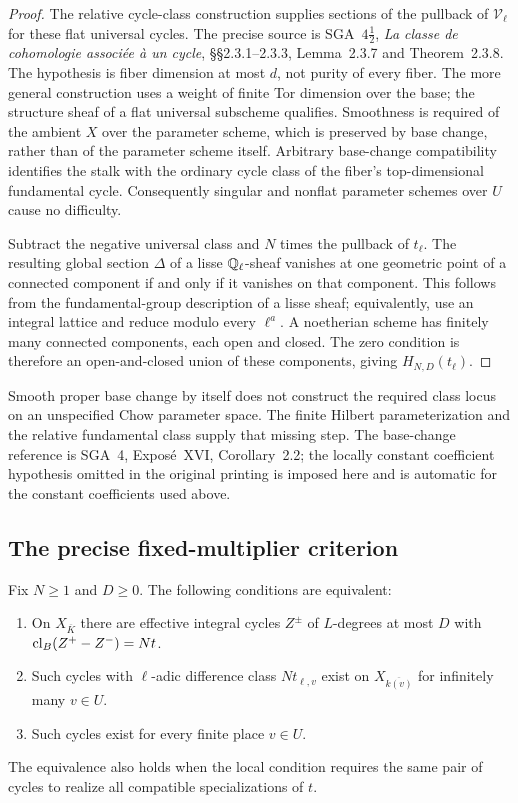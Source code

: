 \begin{proof}
The relative cycle-class construction supplies sections of the pullback of
$\mathcal V_\ell$ for these flat universal cycles. The precise source is
SGA~$4\frac12$, \emph{La classe de cohomologie associ\'ee \`a un cycle},
\S\S2.3.1--2.3.3, Lemma~2.3.7 and Theorem~2.3.8. The hypothesis is fiber
dimension at most $d$, not purity of every fiber. The more general
construction uses a weight of finite Tor dimension over the base; the
structure sheaf of a flat universal subscheme qualifies. Smoothness is
required of the ambient $X$ over the parameter scheme, which is preserved
by base change, rather than of the parameter scheme itself. Arbitrary
base-change compatibility identifies the stalk with the ordinary cycle
class of the fiber's top-dimensional fundamental cycle. Consequently
singular and nonflat parameter schemes over $U$ cause no difficulty.

Subtract the negative universal class and $N$ times the pullback of
$t_\ell$. The resulting global section $\Delta$ of a lisse $\mathbb Q_\ell$-sheaf
vanishes at one geometric point of a connected component if and only if it
vanishes on that component. This follows from the fundamental-group
description of a lisse sheaf; equivalently, use an integral lattice and
reduce modulo every $\ell^a$. A noetherian scheme has finitely many connected
components, each open and closed. The zero condition is therefore an
open-and-closed union of these components, giving $H_{N,D}(t_\ell)$.
\end{proof}

\begin{remark}
Smooth proper base change by itself does not construct the required class
locus on an unspecified Chow parameter space. The finite Hilbert
parameterization and the relative fundamental class supply that missing
step. The base-change reference is SGA~4, Expos\'e~XVI, Corollary~2.2; the
locally constant coefficient hypothesis omitted in the original printing
is imposed here and is automatic for the constant coefficients used above.
\end{remark}

\subsection{The precise fixed-multiplier criterion}

\begin{theorem}
Fix $N\geq1$ and $D\geq0$. The following conditions are equivalent:
\begin{enumerate}
\item On $X_{\overline K}$ there are effective integral cycles $Z^\pm$ of
$L$-degrees at most $D$ with $\operatorname{cl}_B(Z^+-Z^-)=Nt$.
\item Such cycles with $\ell$-adic difference class $Nt_{\ell,v}$ exist on
$X_{\overline{k(v)}}$ for infinitely many $v\in U$.
\item Such cycles exist for every finite place $v\in U$.
\end{enumerate}
The equivalence also holds when the local condition requires the same pair
of cycles to realize all compatible specializations of $t$.
\end{theorem}

